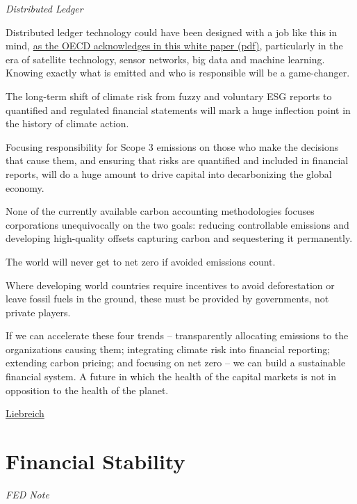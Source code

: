 \documentclass[
]{book}
\begin{document}
\emph{Distributed Ledger}

Distributed ledger technology could have been designed with a job like this in mind,
\href{https://www.oecd.org/finance/Blockchain-technologies-as-a-digital-enabler-for-sustainable-infrastructure-key-findings.pdf}{as the OECD acknowledges in this white paper (pdf)},
particularly in the era of satellite technology, sensor networks,
big data and machine learning.
Knowing exactly what is emitted and who is responsible will be a game-changer.

The long-term shift of climate risk from fuzzy and voluntary ESG reports to quantified and regulated financial statements will mark a huge inflection point in the history of climate action.

Focusing responsibility for Scope 3 emissions on those who make the decisions that cause them, and ensuring that risks are quantified and included in financial reports, will do a huge amount to drive capital into decarbonizing the global economy.

None of the currently available carbon accounting methodologies
focuses corporations unequivocally on the two goals:
reducing controllable emissions and
developing high-quality offsets capturing carbon and sequestering it permanently.

The world will never get to net zero if avoided emissions count.

Where developing world countries require incentives to avoid deforestation
or leave fossil fuels in the ground,
these must be provided by governments, not private players.

If we can accelerate these four trends -- transparently allocating emissions to the organizations causing them; integrating climate risk into financial reporting; extending carbon pricing; and focusing on net zero -- we can build a sustainable financial system. A future in which the health of the capital markets is not in opposition to the health of the planet.

\href{https://about.bnef.com/blog/liebreich-climate-and-finance-lessons-from-a-time-machine/}{Liebreich}

\hypertarget{financial-stability}{%
\section{Financial Stability}\label{financial-stability}}

\emph{FED Note}
\end{document}
